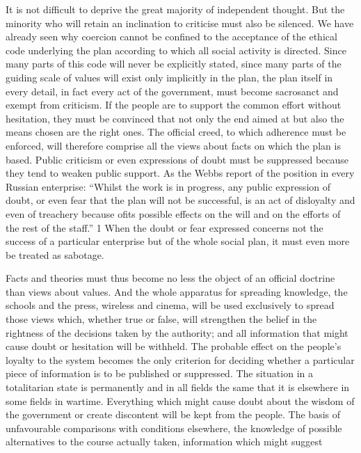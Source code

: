 \documentclass[11pt,openany]{book}
\begin{document}
\begin{center}\textasteriskcentered\hspace{0.9em}\textasteriskcentered\hspace{0.9em}\textasteriskcentered\end{center}

\begin{center}\textasteriskcentered\hspace{0.9em}\textasteriskcentered\hspace{0.9em}\textasteriskcentered\end{center}

It is not difficult to deprive the great majority of independent thought. But the minority who will retain an inclination to criticise must also be silenced. We have already seen why coercion cannot be confined to the acceptance of the ethical code underlying the plan according to which all social activity is directed. Since many parts of this code will never be explicitly stated, since many parts of the guiding scale of values will exist only implicitly in the plan, the plan itself in every detail, in fact every act of the government, must become sacrosanct and exempt from criticism. If the people are to support the common effort without hesitation, they must be convinced that not only the end aimed at but also the means chosen are the right ones. The official creed, to which adherence must be enforced, will therefore comprise all the views about facts on which the plan is based. Public criticism or even expressions of doubt must be suppressed because they tend to weaken public support. As the Webbs report of the position in every Russian enterprise: ``Whilst the work is in progress, any public expression of doubt, or even fear that the plan will not be successful, is an act of disloyalty and even of treachery because ofits possible effects on the will and on the efforts of the rest of the staff.'' 1 When the doubt or fear expressed concerns not the success of a particular enterprise but of the whole social plan, it must even more be treated as sabotage.

Facts and theories must thus become no less the object of an official doctrine than views about values. And the whole apparatus for spreading knowledge, the schools and the press, wireless and cinema, will be used exclusively to spread those views which, whether true or false, will strengthen the belief in the rightness of the decisions taken by the authority; and all information that might cause doubt or hesitation will be withheld. The probable effect on the people's loyalty to the system becomes the only criterion for deciding whether a particular piece of information is to be published or suppressed. The situation in a totalitarian state is permanently and in all fields the same that it is elsewhere in some fields in wartime. Everything which might cause doubt about the wisdom of the government or create discontent will be kept from the people. The basis of unfavourable comparisons with conditions elsewhere, the knowledge of possible alternatives to the course actually taken, information which might suggest
\end{document}
